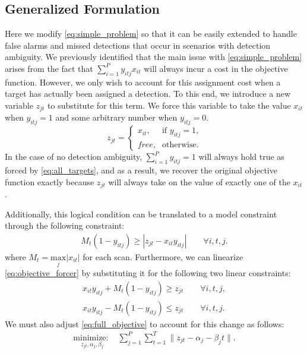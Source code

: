 \subsection{Generalized Formulation}
Here we modify \eqref{eq:simple_problem} so that it can be easily extended to handle false alarms and missed detections that occur in scenarios with detection ambiguity. We previously identified that the main issue with \eqref{eq:simple_problem} arises from the fact that $\sum_{i=1}^{P}y_{itj}x_{it}$ will always incur a cost in the objective function. However, we only wish to account for this assignment cost when a target has actually been assigned a detection. To this end, we introduce a new variable $z_{jt}$ to substitute for this term. We force this variable to take the value $x_{it}$ when $y_{itj}=1$ and some arbitrary number when $y_{itj}=0$. 
\[z_{jt} =
\begin{cases}
x_{it}, & \text{if $y_{itj} = 1$,} \\
\textit{free}, & \text{otherwise.}
\end{cases}\]
In the case of no detection ambiguity, $\sum_{i=1}^{P} y_{itj} = 1$ will always hold true as forced by \eqref{eq:all_targets}, and as a result, we recover the original objective function exactly because $z_{jt}$ will always take on the value of exactly one of the $x_{it}$.

Additionally, this logical condition can be translated to a model constraint through the following constraint:
\begin{align}\label{eq:objective_forcer}
M_{t}(1-y_{itj}) \geq |z_{jt} - x_{it}y_{itj}| \qquad \forall i,t,j.
\end{align}
where $M_{t} = \underset{j}{\text{max}}|x_{it}|$ for each scan. Furthermore, we can linearize \eqref{eq:objective_forcer} by substituting it for the following two linear constraints:
\begin{align*}
x_{it}y_{itj} + M_{t}(1-y_{itj}) \geq z_{jt} \qquad \forall i,t,j,\\
x_{it}y_{itj} - M_{t}(1-y_{itj}) \leq z_{jt} \qquad \forall i,t,j.
\end{align*}
We must also adjust \eqref{eq:full_objective} to account for this change as follows:
\begin{align}\label{eq:generalized_objective}
\underset{z_{jt}, \alpha_{j}, \beta_{j}}{\text{minimize: }} & \sum_{j=1}^{P} \sum_{t=1}^{T} \|z_{jt} - \alpha_{j} - \beta_{j}t\|.
\end{align}

